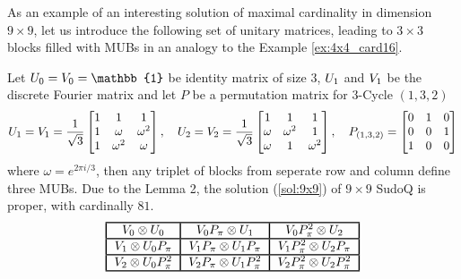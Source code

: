 \documentclass[11pt]{article}
\begin{document}
As an example of an interesting solution of maximal cardinality in dimension $9 \times 9$, let us introduce the following set of unitary matrices, leading to $3 \times 3$ blocks filled with MUBs in an analogy to the Example \ref{ex:4x4_card16}. 
\begin{example}
Let $\mathnormal{U}_0=\mathnormal{V}_0=\mathbb{1}$ be identity matrix of size $3$,  $\mathnormal{U}_1$ and $\mathnormal{V}_1$ be the discrete Fourier matrix and let $P$ be a permutation matrix for $3$-Cycle $(1,3,2)$
\[
\mathnormal{U}_1=\mathnormal{V}_1=
\frac{1}{\sqrt{3}}
\begin{bmatrix}
    1 & 1 & 1 \\
    1 & \omega & \omega^2 \\
    1 & \omega^2 & \omega
\end{bmatrix},
    \quad    
    \mathnormal{U}_2=\mathnormal{V}_2=
\frac{1}{\sqrt{3}}
\begin{bmatrix}
    1 & 1 & 1 \\
    \omega & \omega^2 & 1 \\
    \omega & 1 & \omega^2
\end{bmatrix}, 
    \quad
P_{(1,3,2)} = 
\begin{bmatrix}
    0 & 1 & 0 \\
    0 & 0 & 1 \\
    1 & 0 & 0
\end{bmatrix}
\]
where $\omega=e^{2\pi i/3}$, then any triplet of blocks from seperate row and column define three MUBs. Due to the Lemma 2, the solution (\ref{sol:9x9}) of $9\times9$ SudoQ is proper, with cardinally $81$. 
\begin{equation}\label{sol:9x9}
\begin{tabular}{!{\vrule width 1pt}c!{\vrule width 1pt}c!{\vrule width 1pt}c!{\vrule width 1pt}c!{\vrule width 1pt}c!{\vrule width 1pt}}
    \noalign{\hrule height 1pt}
    $\mathnormal{V}_0\otimes\mathnormal{U}_0$ & $\mathnormal{V}_0\mathnormal{P}_\pi\otimes\mathnormal{U}_1$ & $\mathnormal{V}_0\mathnormal{P}_\pi^2\otimes\mathnormal{U}_2$ \tabularnewline
    \noalign{\hrule height 1pt}
    $\mathnormal{V}_1\otimes\mathnormal{U}_0\mathnormal{P}_\pi$ & $\mathnormal{V}_1\mathnormal{P}_\pi\otimes\mathnormal{U}_1\mathnormal{P}_\pi$ & $\mathnormal{V}_1\mathnormal{P}_\pi^2\otimes\mathnormal{U}_2\mathnormal{P}_\pi$ \tabularnewline
    \noalign{\hrule height 1pt}
    $\mathnormal{V}_2\otimes\mathnormal{U}_0\mathnormal{P}_\pi^2$ & $\mathnormal{V}_2\mathnormal{P}_\pi\otimes\mathnormal{U}_1\mathnormal{P}_\pi^2$ & $\mathnormal{V}_2\mathnormal{P}_\pi^2\otimes\mathnormal{U}_2\mathnormal{P}_\pi^2$ \tabularnewline
    \noalign{\hrule height 1pt}
    \end{tabular}
\end{equation}
\end{example}

\printbibliography
\end{document}
